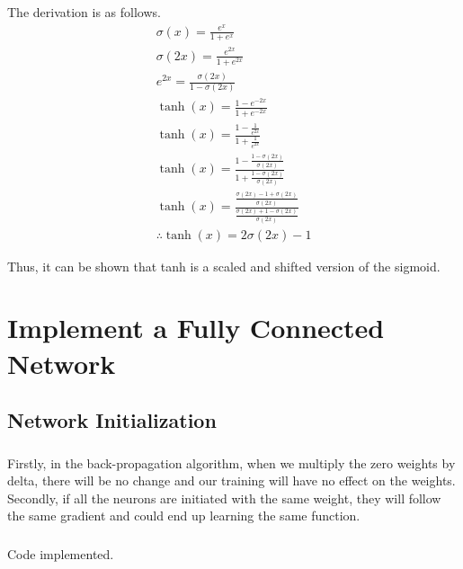 \documentclass[a4paper]{article}
\begin{document}
\subsubsection{}
The derivation is as follows.
\begin{equation}
\begin{gathered}
    \sigma ( x ) = \frac { e ^ { x } } { 1 + e ^ { x } } \\
    \sigma ( 2x ) = \frac { e ^ { 2x } } { 1 + e ^ { 2x } } \\
    e ^ { 2x } = \frac { \sigma ( 2x ) } { 1 - \sigma ( 2x ) } \\
    \tanh ( x ) = \frac { 1 - e ^ { - 2 x } } { 1 + e ^ { - 2 x } } \\
    \tanh ( x ) = \frac { 1 - \frac{1}{e ^ { 2 x }} } { 1 + \frac{1}{e ^ { 2 x }} } \\
    \tanh ( x ) = \frac { 1 - \frac { 1 - \sigma ( 2x ) }{ \sigma ( 2x ) }  } { 1 + \frac { 1 - \sigma ( 2x ) }{ \sigma ( 2x ) } } \\
    \tanh ( x ) = \frac { \frac { \sigma ( 2x ) - 1 + \sigma ( 2x ) }{ \sigma ( 2x ) }  } { \frac { \sigma ( 2x ) + 1 - \sigma ( 2x ) }{ \sigma ( 2x ) } } \\
    \therefore \tanh ( x ) = 2 \sigma ( 2x ) - 1
\end{gathered}
\end{equation}

Thus, it can be shown that tanh is a scaled and shifted version of the sigmoid.

\section{Implement a Fully Connected Network}
\subsection{Network Initialization}
\subsubsection{}
Firstly, in the back-propagation algorithm, when we multiply the zero weights by delta, there will be no change and our training will have no effect on the weights. Secondly, if all the neurons are initiated with the same weight, they will follow the same gradient and could end up learning the same function.

\subsubsection{}
Code implemented.
\end{document}
